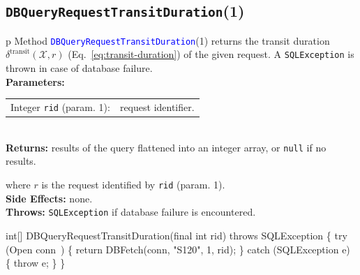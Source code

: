 \subsection{{\tt{}\protect{}DBQueryRequestTransitDuration}(1)}
\begin{tabular}{p{\textwidth}}
\toprule
{}
Method \textcolor{blue}{{\tt{}\protect{}DBQueryRequestTransitDuration}}(1) returns the
transit duration $\delta^\textrm{transit}(\mathcal{X},r)$
(Eq.~\ref{eq:transit-duration}) of the given request.
A {\tt{}SQLException} is thrown in case of database failure.\\
\midrule
\textbf{Parameters:}\\
\begin{tabular}{lp{116mm}}
Integer {\tt{}rid} (param. 1):&request identifier.
\end{tabular}\\
\textbf{Returns:} results of the query flattened into an integer array,
or {\tt{}null} if no results.


where $r$ is the request identified by {\tt{}rid} (param. 1).\\
\textbf{Side Effects:} none.\\
\textbf{Throws:} {\tt{}SQLException} if database failure is encountered.\\
\bottomrule
\end{tabular}
\nwenddocs{}\endmoddef{}
int[] DBQueryRequestTransitDuration(final int rid) throws SQLException \{
  try (\LA{}Open \code{}conn\edoc{}~{\nwtagstyle{}}\RA{}) \{
    return DBFetch(conn, "S120", 1, rid);
  \} catch (SQLException e) \{
    throw e;
  \}
\}
\eatline
{}\nwendcode{}\nwdocspar
